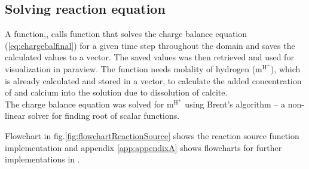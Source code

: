 
\subsection*{Solving reaction equation} A function,, calls  function that solves the charge 
balance equation (\ref{eq:chargebalfinal}) for a given time step throughout the domain and saves the calculated values to a vector. 
The saved values was then retrieved and used for visualization in paraview. The function  needs molality of 
hydrogen ($\mathrm{m^{H^+}}$), which is already calculated and stored in a vector, to calculate the added concentration of  
and calcium into the solution due to dissolution of calcite. \\
The charge balance equation was solved for $\mathrm{m^{H^+}}$ using Brent's algorithm \citet{brent1971algorithm} -- a non-linear solver 
for finding root of scalar functions. 


Flowchart in fig.\ref{fig:flowchartReactionSource} shows the reaction source function implementation and appendix \ref{app:appendixA} 
shows flowcharts for further implementations in \DuMuX.




